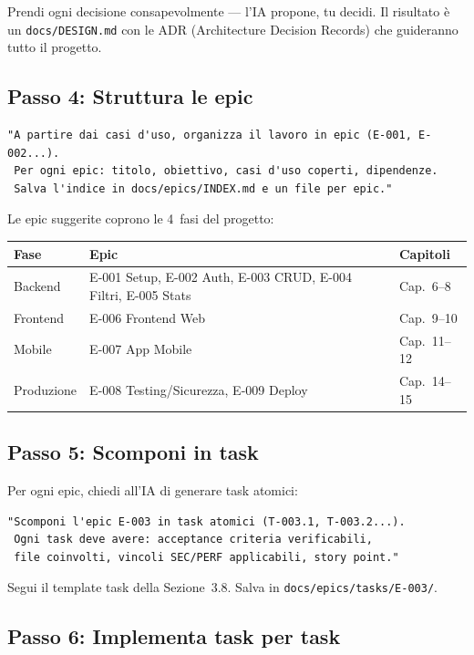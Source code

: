 Prendi ogni decisione consapevolmente --- l'IA propone, tu decidi. Il risultato è un \texttt{docs/DESIGN.md} con le ADR (Architecture Decision Records) che guideranno tutto il progetto.

\subsection{Passo 4: Struttura le epic}

\begin{lstlisting}[language={}]
"A partire dai casi d'uso, organizza il lavoro in epic (E-001, E-002...).
 Per ogni epic: titolo, obiettivo, casi d'uso coperti, dipendenze.
 Salva l'indice in docs/epics/INDEX.md e un file per epic."
\end{lstlisting}

Le epic suggerite coprono le 4~fasi del progetto:

\begin{center}
\begin{tabularx}{\textwidth}{l l X}
\toprule
\textbf{Fase} & \textbf{Epic} & \textbf{Capitoli} \\
\midrule
Backend & E-001 Setup, E-002 Auth, E-003 CRUD, E-004 Filtri, E-005 Stats & Cap.~6--8 \\
Frontend & E-006 Frontend Web & Cap.~9--10 \\
Mobile & E-007 App Mobile & Cap.~11--12 \\
Produzione & E-008 Testing/Sicurezza, E-009 Deploy & Cap.~14--15 \\
\bottomrule
\end{tabularx}
\end{center}

\subsection{Passo 5: Scomponi in task}

Per ogni epic, chiedi all'IA di generare task atomici:

\begin{lstlisting}[language={}]
"Scomponi l'epic E-003 in task atomici (T-003.1, T-003.2...).
 Ogni task deve avere: acceptance criteria verificabili,
 file coinvolti, vincoli SEC/PERF applicabili, story point."
\end{lstlisting}

Segui il template task della Sezione~3.8. Salva in \texttt{docs/epics/tasks/E-003/}.

\subsection{Passo 6: Implementa task per task}

